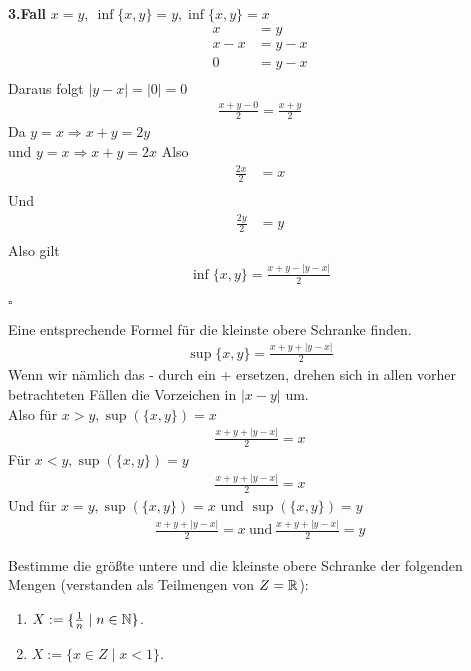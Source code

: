 \begin{lsg}
\noindent
\textbf{3.Fall} 
$x=y, \ \inf\{x,y\}=y, \inf\{x,y\}=x$
\begin{align*}
    x&=y \\
    x-x&=y-x \\
    0&=y-x \\
\end{align*}
Daraus folgt $|y-x|=|0|=0$
\begin{align*}
    \frac{x+y-0}{2}=\frac{x+y}{2}
\end{align*}
Da $y=x \Rightarrow x+y=2y$ \\
und $y=x \Rightarrow x+y=2x$
Also
\begin{align*}
    \frac{2x}{2}&=x\\
\end{align*}
Und 
\begin{align*}
    \frac{2y}{2}&=y\\
\end{align*}
Also gilt
\begin{align*}
    \inf\{x,y\}=\frac{x+y-|y-x|}{2}
\end{align*}
\begin{flushright}
$\square$
\end{flushright}
Eine entsprechende Formel für die kleinste obere Schranke finden. \\
\begin{align*}
    \sup\{x,y\}=\frac{x+y+|y-x|}{2}
\end{align*}
Wenn wir nämlich das - durch ein + ersetzen, drehen sich in allen vorher betrachteten Fällen die Vorzeichen in $|x-y|$ um.\\
Also für $x>y, \sup(\{x,y\})=x$
\begin{align*}
    \frac{x+y+|y-x|}{2}=x
\end{align*}
Für $x<y, \sup(\{x,y\})=y$
\begin{align*}
    \frac{x+y+|y-x|}{2}=x
\end{align*}
Und für $x=y, \sup(\{x,y\})=x$ und $\sup(\{x,y\})=y$
\begin{align*}
    \frac{x+y+|y-x|}{2}=x \ \text{und} \ \frac{x+y+|y-x|}{2}=y
\end{align*}
\end{lsg}


\bigskip


\begin{aufg}[6 Punkte]
Bestimme die gr\"o{\ss}te untere und die kleinste obere Schranke der folgenden Mengen (verstanden als Teilmengen von $Z=\mathbb{R}$):
\begin{enumerate}[label=$\mathrm{(\roman*)}$, ref=$\mathrm{\roman*}$]
\item $X:=\{ \frac{1}{n} \mid n\in \mathbb{N}\}$.
\item $X:=\{ x \in Z \mid x < 1 \}$.
\end{enumerate}
\end{aufg}
 
